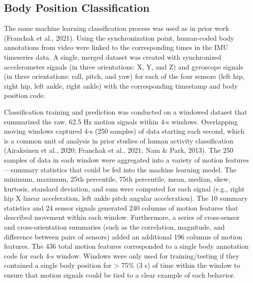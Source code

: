 \documentclass[
  man]{apa6}
\begin{document}
\hypertarget{body-position-classification}{%
\subsection{Body Position Classification}\label{body-position-classification}}

The same machine learning classification process was used as in prior work (Franchak et al., 2021). Using the synchronization point, human-coded body annotations from video were linked to the corresponding times in the IMU timeseries data. A single, merged dataset was created with synchronized accelerometer signals (in three orientations: X, Y, and Z) and gyroscope signals (in three orientations: roll, pitch, and yaw) for each of the four sensors (left hip, right hip, left ankle, right ankle) with the corresponding timestamp and body position code.

Classification training and prediction was conducted on a windowed dataset that summarized the raw, 62.5 Hz motion signals within 4-s windows. Overlapping moving windows captured 4-s (250 samples) of data starting each second, which is a common unit of analysis in prior studies of human activity classification (Airaksinen et al., 2020; Franchak et al., 2021; Nam \& Park, 2013). The 250 samples of data in each window were aggregated into a variety of motion features---summary statistics that could be fed into the machine learning model. The minimum, maximum, 25th percentile, 75th percentile, mean, median, skew, kurtosis, standard deviation, and sum were computed for each signal (e.g., right hip X linear acceleration, left ankle pitch angular acceleration). The 10 summary statistics and 24 sensor signals generated 240 columns of motion features that described movement within each window. Furthermore, a series of cross-sensor and cross-orientation summaries (such as the correlation, magnitude, and difference between pairs of sensors) added an additional 196 columns of motion features. The 436 total motion features corresponded to a single body annotation code for each 4-s window. Windows were only used for training/testing if they contained a single body position for \textgreater{} 75\% (3 s) of time within the window to ensure that motion signals could be tied to a clear example of each behavior.
\end{document}

